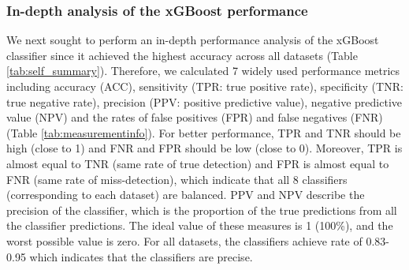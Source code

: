 \documentclass{bmcart}
\begin{document}
\subsubsection*{In-depth analysis of the xGBoost performance}
We next sought to perform an in-depth performance analysis of the xGBoost classifier since it achieved the highest accuracy across all datasets (Table \ref{tab:self_summary}). Therefore, we calculated 7 widely used performance metrics including accuracy (ACC), sensitivity (TPR: true positive rate), speciﬁcity (TNR: true negative rate), precision (PPV: positive predictive value), negative predictive value (NPV) and the rates of false positives (FPR) and false negatives (FNR) (Table \ref{tab:measurementinfo}). 
For better performance, TPR and TNR should be high (close to 1) and FNR and FPR should be low (close to 0). Moreover, TPR is almost equal to TNR (same rate of true detection) and FPR is almost equal to FNR (same rate of miss-detection), which indicate that all  8 classifiers (corresponding to each dataset) are balanced.
PPV and  NPV describe the precision of the classifier, which is the proportion of the true predictions from all the classifier predictions. The ideal value of these measures is 1 (100\%), and the worst possible value is zero. For all datasets, the classifiers achieve rate of 0.83-0.95 which indicates that the classifiers are precise.
\end{document}
